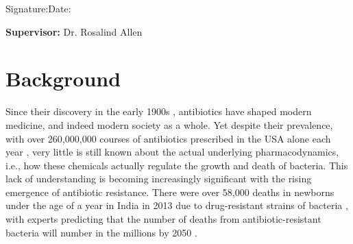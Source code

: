 \documentclass[a4paper,12pt]{article}
\begin{document}
\vspace*{1cm}

\vspace*{3cm}
Signature:\hspace*{8cm}Date:

\vfill
{\bf Supervisor:} Dr. Rosalind Allen                %
\newpage
\setcounter{page}{1}                            %
\footruleheight{1pt}
\headruleheight{1pt}
\rhead{- \thepage}
\cfoot{}
%
\tableofcontents                                %
\pagebreak

\section{Background}


Since their discovery in the early 1900s \cite{bioref:first-antibiotics}, antibiotics have shaped modern medicine,
and indeed modern society as a whole.  Yet despite their prevalence, with over 260,000,000 courses of antibiotics prescribed 
in the USA alone each year \cite{bioref:antibiotics-usage-USA-2011}, very little is still known about the actual 
underlying pharmacodynamics, i.e., how these chemicals actually regulate the growth and death of bacteria.  This 
lack of understanding is becoming increasingly significant with the rising emergence of antibiotic resistance.  
There were over 58,000 deaths in newborns under the age of a year in India in 2013 due to drug-resistant 
strains of bacteria \cite{bioref:india-death-stats}, with experts predicting that the number of deaths from 
antibiotic-resistant bacteria will number in the millions by 2050 \cite{bioref:future-death-stats}.
\end{document}
